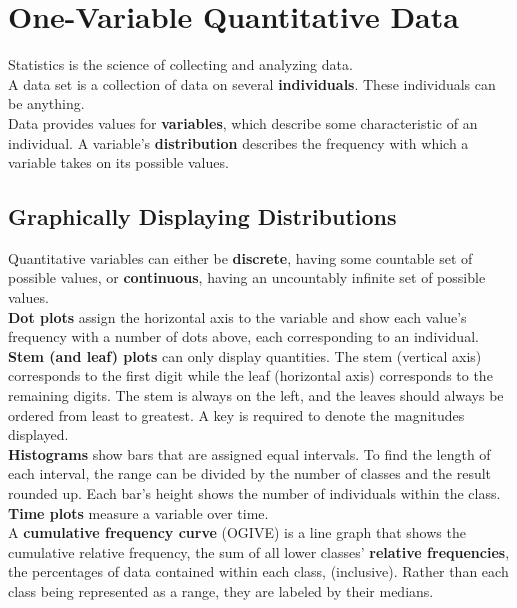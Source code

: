 \documentclass[../AP_Statistics.tex]{subfiles}
\begin{document}
	\chapter{One-Variable Quantitative Data}
		Statistics is the science of collecting and analyzing data. \\
		A data set is a collection of data on several \textbf{individuals}. These individuals can be anything. \\
		Data provides values for \textbf{variables}, which describe some characteristic of an individual.
		A variable's \textbf{distribution} describes the frequency with which a variable takes on its possible values.
		\section{Graphically Displaying Distributions}
			Quantitative variables can either be \textbf{discrete}, having some countable set of possible values, or \textbf{continuous}, having an uncountably infinite set of possible values. \\
			\textbf{Dot plots} assign the horizontal axis to the variable and show each value's frequency with a number of dots above, each corresponding to an individual. \\
			\textbf{Stem (and leaf) plots} can only display quantities. The stem (vertical axis) corresponds to the first digit while the leaf (horizontal axis) corresponds to the remaining digits. The stem is always on the left, and the leaves should always be ordered from least to greatest. A key is required to denote the magnitudes displayed. \\
			\textbf{Histograms} show bars that are assigned equal intervals. To find the length of each interval, the range can be divided by the number of classes and the result rounded up. Each bar's height shows the number of individuals within the class. \\
			\textbf{Time plots} measure a variable over time. \\
			A \textbf{cumulative frequency curve} (OGIVE) is a line graph that shows the cumulative relative frequency, the sum of all lower classes' \textbf{relative frequencies}, the percentages of data contained within each class, (inclusive). Rather than each class being represented as a range, they are labeled by their medians.
\end{document}
